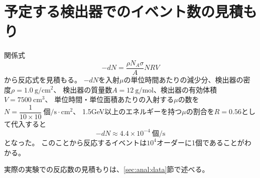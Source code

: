 \section{予定する検出器でのイベント数の見積もり}
関係式
\begin{equation}
    -dN =\dfrac{\rho N_A \sigma }{A}NRV
\end{equation}
から反応式を見積もる。
$-dN$を入射$\mu$の単位時間あたりの減少分、検出器の密度$\rho = 1.0 \ \mathrm{g/cm^2}$、
検出器の質量数$A = 12 \ \mathrm{g/mol}$、検出器の有効体積$V = 7500 \ \mathrm{cm^3}$、
単位時間・単位面積あたりの入射する$\mu$の数を$N = \dfrac{1}{10\times 10} \ \mathrm{個/s\cdot cm^2}$、
1.5GeV以上のエネルギーを持つ$\mu$の割合を$R = 0.56$として代入すると
\begin{equation}
    -dN \approx 4.4 \times 10^{-4} \ \mathrm{個/s}
\end{equation}
となった。
このことから反応するイベントは$10^4$オーダーに1個であることがわかる。

実際の実験での反応数の見積もりは、\ref{sec:anal:data}節で述べる。